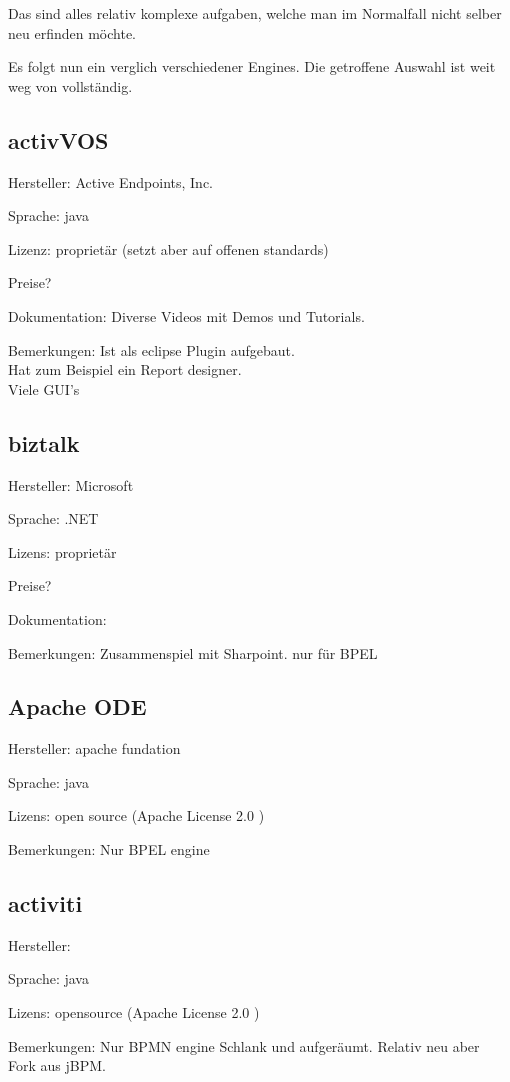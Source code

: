 \documentclass[paper=a4,twoside=false,BCOR=0mm,DIV=calc,fontsize=12pt]{scrartcl}
\begin{document}
Das sind alles relativ komplexe aufgaben, welche man im Normalfall nicht selber neu erfinden möchte.

Es folgt nun ein verglich verschiedener Engines. Die getroffene Auswahl ist weit weg von vollständig.



\subsection{activVOS}
Hersteller: Active Endpoints, Inc.

Sprache: java

Lizenz: proprietär (setzt aber auf offenen standards)


Preise?

Dokumentation: Diverse Videos mit Demos und Tutorials.

Bemerkungen: Ist als eclipse Plugin aufgebaut. \\
Hat zum Beispiel ein Report designer. \\
Viele GUI's


\subsection{biztalk}
Hersteller: Microsoft

Sprache: .NET

Lizens: proprietär


Preise?

Dokumentation:

Bemerkungen:
Zusammenspiel mit Sharpoint.
nur für BPEL


\subsection{Apache ODE}
Hersteller: apache fundation

Sprache: java

Lizens: open source (Apache License 2.0 )

Bemerkungen:
Nur BPEL engine



\subsection{activiti}
Hersteller:

Sprache: java

Lizens: opensource (Apache License 2.0 )


Bemerkungen:
Nur BPMN engine
Schlank und aufgeräumt. 
Relativ neu aber Fork aus jBPM.
\end{document}
